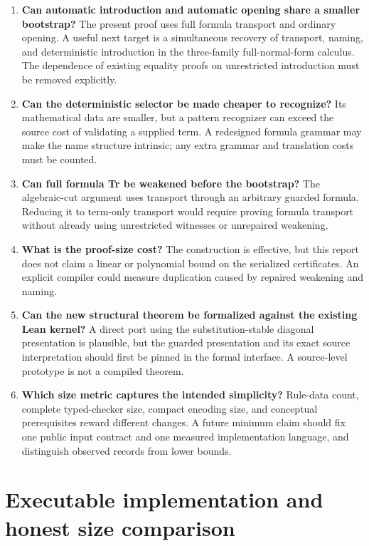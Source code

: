 \documentclass[11pt,letterpaper]{article}
\theoremstyle{definition}\newtheorem{definition}[theorem]{Definition}
\theoremstyle{remark}\newtheorem{remark}[theorem]{Remark}
\begin{document}
\begin{enumerate}
\item \textbf{Can automatic introduction and automatic opening share a
      smaller bootstrap?} The present proof uses full formula transport and
      ordinary opening. A useful next target is a simultaneous recovery of
      transport, naming, and deterministic introduction in the three-family
      full-normal-form calculus. The dependence of existing equality proofs
      on unrestricted introduction must be removed explicitly.
\item \textbf{Can the deterministic selector be made cheaper to recognize?}
      Its mathematical data are smaller, but a pattern recognizer can exceed
      the source cost of validating a supplied term. A redesigned formula
      grammar may make the name structure intrinsic; any extra grammar and
      translation costs must be counted.
\item \textbf{Can full formula Tr be weakened before the bootstrap?}
      The algebraic-cut argument uses transport through an arbitrary guarded
      formula. Reducing it to term-only transport would require proving
      formula transport without already using unrestricted witnesses or
      unrepaired weakening.
\item \textbf{What is the proof-size cost?} The construction is effective,
      but this report does not claim a linear or polynomial bound on the
      serialized certificates. An explicit compiler could measure duplication
      caused by repaired weakening and naming.
\item \textbf{Can the new structural theorem be formalized against the
      existing Lean kernel?} A direct port using the substitution-stable
      diagonal presentation is plausible, but the guarded presentation and
      its exact source interpretation should first be pinned in the formal
      interface. A source-level prototype is not a compiled theorem.
\item \textbf{Which size metric captures the intended simplicity?}
      Rule-data count, complete typed-checker size, compact encoding size,
      and conceptual prerequisites reward different changes. A future
      minimum claim should fix one public input contract and one measured
      implementation language, and distinguish observed records from lower
      bounds.
\end{enumerate}


\section{Executable implementation and honest size comparison}
\end{document}
